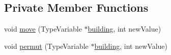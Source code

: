 \subsection*{Private Member Functions}
\begin{DoxyCompactItemize}
\item 
void \hyperlink{classghost_1_1Solver_a58d9540a9700be0e953ebdcf0660920f}{move} (Type\-Variable $\ast$\hyperlink{namespaceghost_a7c0deb8266504feb7d025903f2b77693a4b7c211d9226050e5730e3b9a1b0b21a}{building}, int new\-Value)
\item 
void \hyperlink{classghost_1_1Solver_ae3489c7f10952a8a0a2a0895b9b1c8fe}{permut} (Type\-Variable $\ast$\hyperlink{namespaceghost_a7c0deb8266504feb7d025903f2b77693a4b7c211d9226050e5730e3b9a1b0b21a}{building}, int new\-Value)
\end{DoxyCompactItemize}
